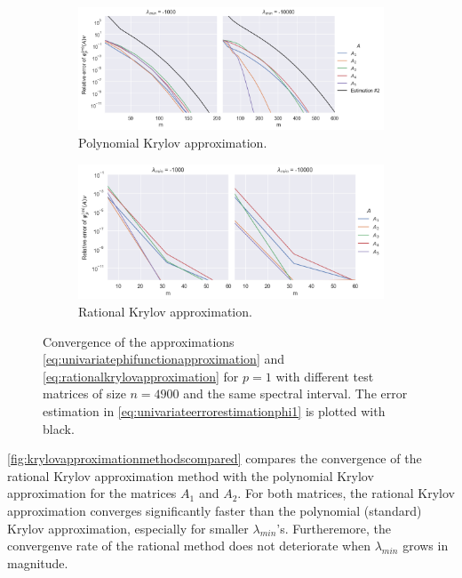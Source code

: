 \begin{figure}[h!]
    \centering
    \begin{subfigure}[b]{.9\textwidth}
        \includegraphics[width=\textwidth]{img/krylovapproximation/cnvg_matrices_PA_4900.png}
        \caption{Polynomial Krylov approximation.}
        \label{fig:polynomialkrylovapproximationmatrices}
    \end{subfigure}
    \vfill
    \begin{subfigure}[b]{.9\textwidth}
        \includegraphics[width=\textwidth]{img/krylovapproximation/cnvg_matrices_RA_4900.png}
        \caption{Rational Krylov approximation.}
        \label{fig:rationalkrylovapproximationmatrices}
    \end{subfigure}
    \caption{Convergence of the approximations \eqref{eq:univariatephifunctionapproximation} and \eqref{eq:rationalkrylovapproximation}
    for $p=1$ with different test matrices of size $n=4900$ and the same spectral interval. The error estimation in
    \eqref{eq:univariateerrorestimationphi1} is plotted with black.}
    \label{fig:krylovapproximationmatrices}
\end{figure}

\autoref{fig:krylovapproximationmethodscompared} compares the convergence of the rational Krylov approximation method with the
polynomial Krylov approximation for the matrices $A_1$ and $A_2$. For both matrices, the rational Krylov approximation converges
significantly faster than the polynomial (standard) Krylov approximation, especially for smaller $\lambda_{min}$'s. Furtheremore,
the convergenve rate of the rational method does not deteriorate when $\lambda_{min}$ grows in magnitude.

